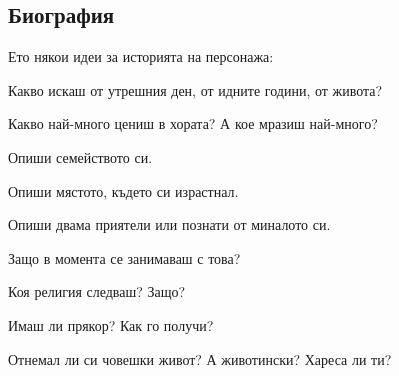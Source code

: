 \subsection{Биография}
Ето някои идеи за историята на персонажа:
\begin{itemize*}
\item{Какво искаш от утрешния ден, от идните години, от живота?}
\item{Какво най-много цениш в хората? А кое мразиш най-много?}
\item{Опиши семейството си.}
\item{Опиши мястото, където си израстнал.}
\item{Опиши двама приятели или познати от миналото си.}
\item{Защо в момента се занимаваш с това?}
\item{Коя религия следваш? Защо?}
\item{Имаш ли прякор? Как го получи?}
\item{Отнемал ли си човешки живот? А животински? Хареса ли ти?}
\end{itemize*}
